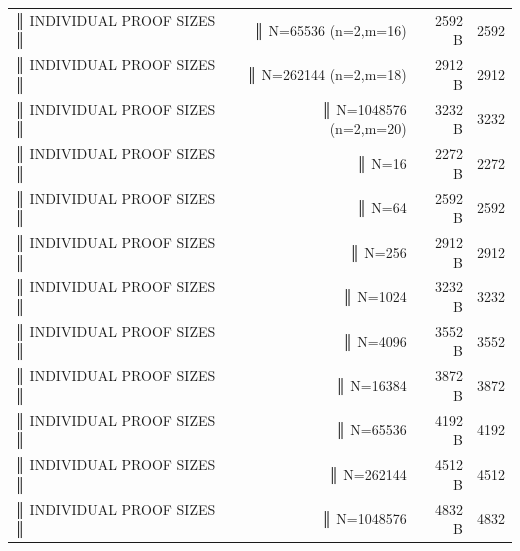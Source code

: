 \begin{table}[h]
\begin{tabular}{lrrr}
║ INDIVIDUAL PROOF SIZES                                         ║ & ║  N=65536      (n=2,m=16) & 2592 B & 2592 \\
║ INDIVIDUAL PROOF SIZES                                         ║ & ║  N=262144     (n=2,m=18) & 2912 B & 2912 \\
║ INDIVIDUAL PROOF SIZES                                         ║ & ║  N=1048576    (n=2,m=20) & 3232 B & 3232 \\
║ INDIVIDUAL PROOF SIZES                                         ║ & ║  N=16 & 2272 B & 2272 \\
║ INDIVIDUAL PROOF SIZES                                         ║ & ║  N=64 & 2592 B & 2592 \\
║ INDIVIDUAL PROOF SIZES                                         ║ & ║  N=256 & 2912 B & 2912 \\
║ INDIVIDUAL PROOF SIZES                                         ║ & ║  N=1024 & 3232 B & 3232 \\
║ INDIVIDUAL PROOF SIZES                                         ║ & ║  N=4096 & 3552 B & 3552 \\
║ INDIVIDUAL PROOF SIZES                                         ║ & ║  N=16384 & 3872 B & 3872 \\
║ INDIVIDUAL PROOF SIZES                                         ║ & ║  N=65536 & 4192 B & 4192 \\
║ INDIVIDUAL PROOF SIZES                                         ║ & ║  N=262144 & 4512 B & 4512 \\
║ INDIVIDUAL PROOF SIZES                                         ║ & ║  N=1048576 & 4832 B & 4832 \\
    \bottomrule
  \end{tabular}
\end{table}
